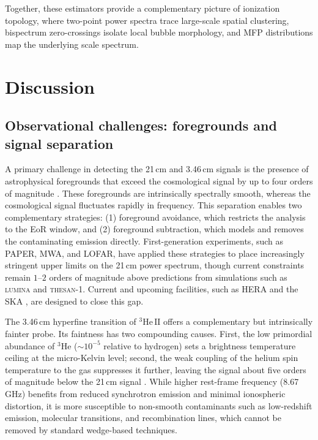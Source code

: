 \documentclass[apj,twocolumn, appendixfloats, twocolappendix, numberedappendix, tighten]{openjournal}
\DeclareRobustCommand{\lumina}{\mbox{\textsc{lumina}}\xspace}
\begin{document}
Together, these estimators provide a complementary picture of ionization topology, where two-point power spectra trace large-scale spatial clustering, bispectrum zero-crossings isolate local bubble morphology, and MFP distributions map the underlying scale spectrum.


\section{Discussion}
\label{sec:discussion}

\subsection{Observational challenges: foregrounds and signal separation} \label{sec:foreground}



A primary challenge in detecting the 21\,cm and 3.46\,cm signals is the presence of astrophysical foregrounds that exceed the cosmological signal by up to four orders of magnitude \citep[][]{Dillon2014, Eastwood2019}. These foregrounds are intrinsically spectrally smooth, whereas the cosmological signal fluctuates rapidly in frequency. This separation enables two complementary strategies: (1) foreground avoidance, which restricts the analysis to the EoR window, and (2) foreground subtraction, which models and removes the contaminating emission directly. First-generation experiments, such as PAPER, MWA, and LOFAR, have applied these strategies to place increasingly stringent upper limits on the 21\,cm power spectrum, though current constraints remain $1$--$2$ orders of magnitude above predictions from simulations such as \lumina and \textsc{thesan-1}. Current and upcoming facilities, such as HERA \citep[][]{DeBoer2017} and the SKA \citep[][]{Koopmans2015, Chapman2015}, are designed to close this gap.


The 3.46\,cm hyperfine transition of $^3\mathrm{He\,II}$ offers a complementary but intrinsically fainter probe. Its faintness has two compounding causes. First, the low primordial abundance of $^3\mathrm{He}$ ($\sim 10^{-5}$ relative to hydrogen) sets a brightness temperature ceiling at the micro-Kelvin level; second, the weak coupling of the helium spin temperature to the gas suppresses it further, leaving the signal about five orders of magnitude below the 21\,cm signal \citep{Bagla2009, McQuinn2009}. While higher rest-frame frequency (8.67 GHz) benefits from reduced synchrotron emission and minimal ionospheric distortion, it is more susceptible to non-smooth contaminants such as low-redshift  emission, molecular transitions, and recombination lines, which cannot be removed by standard wedge-based techniques.
\end{document}
